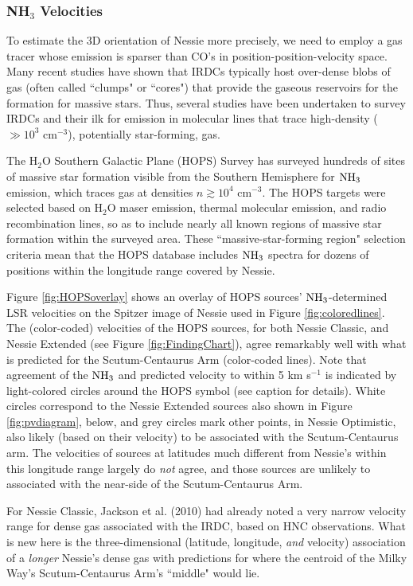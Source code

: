\subsubsection{NH$_3$ Velocities}
\label{ammonia}
To estimate the 3D orientation of Nessie more precisely, we need to employ a gas tracer whose emission is sparser than CO's in position-position-velocity space. Many recent studies have shown that IRDCs typically host over-dense blobs of gas (often called ``clumps" or ``cores") that provide the gaseous reservoirs for the formation for massive stars.  Thus, several studies have been undertaken to survey IRDCs and their ilk for emission in molecular lines that trace high-density ($\gg 10^3$ cm$^{-3}$), potentially star-forming, gas.  

The H$_2$O Southern Galactic Plane (HOPS) Survey \citep{Purcell2012b} has surveyed hundreds of sites of massive star formation visible from the Southern Hemisphere for ${\rm NH}_3$ emission, which traces gas at densities $n\gtrsim 10^4$ cm$^{-3}$.   The HOPS targets were selected based on H$_2$O maser emission, thermal molecular emission, and radio recombination lines, so as to include nearly all known regions of massive star formation within the surveyed area.  These ``massive-star-forming region" selection criteria mean that the HOPS database includes ${\rm NH}_3$ spectra for dozens of positions within the longitude range covered by Nessie.   

Figure \ref{fig:HOPSoverlay} shows an overlay of HOPS sources' ${\rm NH}_3$-determined LSR velocities on the Spitzer image of Nessie used in Figure \ref{fig:coloredlines}.  The (color-coded) velocities of the HOPS sources, for both Nessie Classic, and Nessie Extended (see Figure \ref{fig:FindingChart}), agree remarkably well with what is predicted for the Scutum-Centaurus Arm  (color-coded lines). Note that agreement of the  ${\rm NH}_3$ and predicted velocity to within 5 km s$^{-1}$ is indicated by light-colored circles around the HOPS symbol (see caption for details).  White circles correspond to the Nessie Extended sources also shown in Figure \ref{fig:pvdiagram}, below, and grey circles mark other points, in Nessie Optimistic, also likely (based on their velocity) to be associated with the Scutum-Centaurus arm.  The velocities of sources at latitudes much different from Nessie's within this longitude range largely do {\it not} agree, and those sources are unlikely to associated with the near-side of the Scutum-Centaurus Arm.    

For Nessie Classic, Jackson et al. (2010) had already noted a very narrow velocity range for dense gas associated with the IRDC, based on HNC observations.   What is new here is the three-dimensional (latitude, longitude, \textit{and} velocity) association of a {\it longer} Nessie's dense gas with predictions for where the centroid of the Milky Way's Scutum-Centaurus Arm's ``middle" would lie.  

